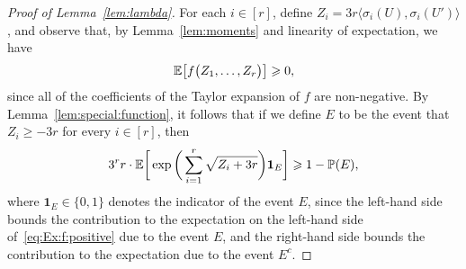\begin{proof}[Proof of Lemma~\ref{lem:lambda}]
For each $i \in [r]$, define $Z_i = 3r\big\langle \sigma_i(U),\sigma_i(U') \big\rangle$, and observe that, by Lemma~\ref{lem:moments} and linearity of expectation, we have
\begin{equation}\label{eq:Ex:f:positive} 
\mathbb{E}\big[ f\big( Z_1,\ldots,Z_r \big) \big] \geqslant 0,
\end{equation}
since all of the coefficients of the Taylor expansion of $f$ are non-negative. By Lemma~\ref{lem:special:function}, it follows that if we define $E$ to be the event that $Z_i \ge -3r$ %
for every $i \in [r]$, then 
\begin{equation}\label{eq:eventE:inequality} 
3^r r \cdot \mathbb{E}\bigg[ \exp\bigg( \sum_{i = 1}^r \sqrt{ Z_i + 3r } \bigg) \mathbf{1}_E \bigg] \geqslant 1 - \mathbb{P}(E),
\end{equation}
where $\mathbf{1}_E \in \{0,1\}$ denotes the indicator of the event $E$, since the left-hand side bounds the %
contribution to the expectation on the left-hand side of~\eqref{eq:Ex:f:positive} due to the event $E$, and the right-hand side bounds the %
contribution to the expectation due to the event $E^c$. 


\end{proof}
